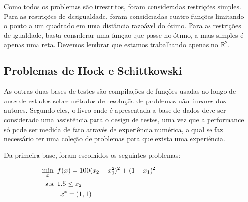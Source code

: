Como todos os problemas são irrestritos, foram consideradas restrições simples.
Para as restrições de desigualdade, foram consideradas quatro funções limitando o
ponto a um quadrado em uma distância razoável do ótimo. Para as restrições de
igualdade, basta considerar uma função que passe no ótimo, a mais simples é
apenas uma reta. Devemos lembrar que estamos trabalhando apenas no \(\mathbb{R}^2\).

\subsection{Problemas de  Hock e Schittkowski}

\noindent
As outras duas bases de testes são compilações de funções usadas ao longo de anos
de estudos sobre métodos de resolução de problemas não lineares dos autores. Segundo
eles, o livro onde é apresentada a base de dados deve ser considerado uma assistência
para o design de testes, uma vez que a performance só pode ser medida de fato através
de experiência numérica, a qual se faz necessário ter uma coleção de problemas para
que exista uma experiência.

Da primeira base, foram escolhidos os seguintes problemas:


\begin{subequations}
  \label{prob_h1}
  \begin{align}
    \hspace*{0pt}\hfill \underset{x}{\text{min}} \hspace{0.2cm} & f(x) = 100(x_2 - x_1^2)^2 + (1-x_1)^2 \hspace{2.85cm} \\
    \hspace*{0pt}\hfill \text{s.a} \hspace{0.2cm} & 1.5 \leq x_2 \hspace{2.85cm} \\
    \hspace*{0pt}\hfill & \hspace{0.15cm} x^* = (1, 1) \hspace{2.85cm} 
  \end{align}
\end{subequations}


\vspace{-0.5cm}

